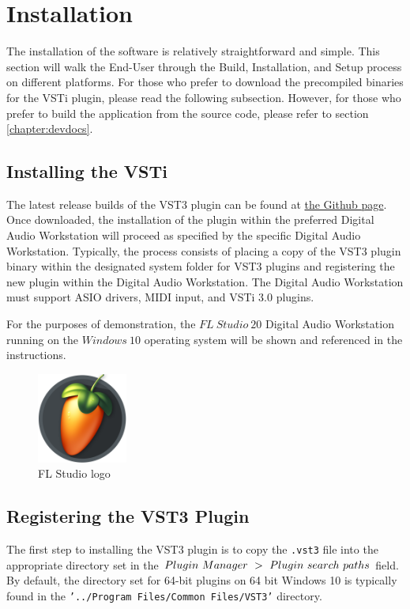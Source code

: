 \documentclass[a4paper,12pt]{report}
\begin{document}
\section{Installation}
\label{sec:installation}
The installation of the software is relatively straightforward and simple. This section will walk the End-User through the Build, Installation, and Setup process on different platforms. For those who prefer to download the precompiled binaries for the VSTi plugin, please read the following subsection. However, for those who prefer to build the application from the source code, please refer to section \ref{chapter:devdocs}.

\subsection{Installing the VSTi}
\label{subsec:installvsti}
The latest release builds of the VST3 plugin can be found at \href{https://github.com/ParadoxChains/C3JI5D-Evan-Sitt-BSc-Thesis/tree/master/Release\%20Builds}{the Github page}\cite{github}. Once downloaded, the installation of the plugin within the preferred Digital Audio Workstation will proceed as specified by the specific Digital Audio Workstation. Typically, the process consists of placing a copy of the VST3 plugin binary within the designated system folder for VST3 plugins and registering the new plugin within the Digital Audio Workstation. The Digital Audio Workstation must support ASIO drivers, MIDI input, and VSTi 3.0 plugins.

For the purposes of demonstration, the $FL\ Studio\ 20$ Digital Audio Workstation running on the $Windows\ 10$ operating system will be shown and referenced in the instructions.

\begin{figure} \centering
\includegraphics[width=8em]{FLStudioLogo.png}
    \caption{FL Studio logo}     \label{fig:FLLogo} \end{figure}

\subsection{Registering the VST3 Plugin}
\label{subsec:registeringvsti}
The first step to installing the VST3 plugin is to copy the \texttt{.vst3} file into the appropriate directory set in the $Plugin\ \-Manager\ \->\ \-Plugin\ \-search\ \-paths$ field. By default, the directory set for 64-bit plugins on 64 bit Windows 10 is typically found in the \texttt{'../Program Files/Common Files/VST3'} directory. 
\end{document}
